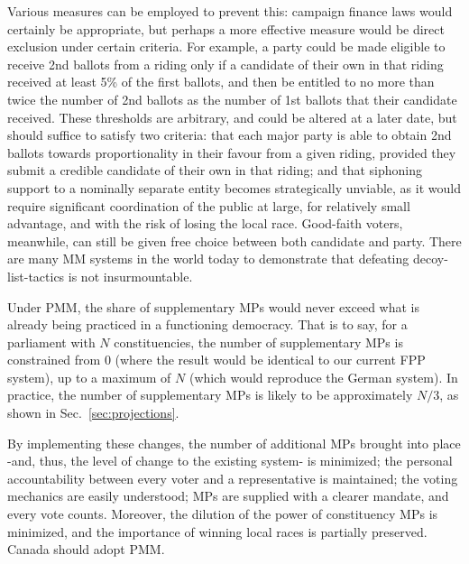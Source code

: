 \documentclass[DIV=calc, paper=a4, fontsize=11pt, twocolumn]{scrartcl}	 %
\begin{document}
Various measures can be employed to prevent this: campaign finance laws would certainly be appropriate, but perhaps a more  effective measure would be direct exclusion under certain criteria.
For example, a party could be made eligible to receive 2nd ballots from a riding only if a candidate of their own in that riding received at least 5\% of the first ballots, and then be entitled to no more than twice the number of 2nd ballots as the number of 1st ballots that their candidate received. 
These thresholds are arbitrary, and could be altered at a later date, but should suffice to satisfy two criteria: that each major party is able to obtain 2nd ballots towards proportionality in their favour from a given riding, provided they submit a credible candidate of their own in that riding; and that siphoning support to a nominally separate entity becomes strategically unviable, as it would require significant coordination of the public at large, for relatively small advantage, and with the risk of losing the local race.
Good-faith voters, meanwhile, can still be given free choice between both candidate and party.
There are many MM systems in the world today to demonstrate that defeating decoy-list-tactics is not insurmountable.

Under PMM, the share of supplementary MPs would never exceed what is already being practiced in a functioning democracy. That is to say, for a parliament with $N$ constituencies, the number of supplementary MPs is constrained from 0 (where the result would be identical to our current FPP system), up to a maximum of $N$ (which would reproduce the German system). In practice, the number of supplementary MPs is likely to be approximately $N/3$, as shown in Sec.~\ref{sec:projections}.

By implementing these changes, the number of additional MPs brought into place \--and, thus, the level of change to the existing system\-- is minimized; the  personal accountability between every voter and a representative is maintained; the voting mechanics are easily understood; MPs are supplied with a clearer mandate, and every vote counts. 
Moreover, the dilution of the power of constituency MPs is minimized, and the importance of winning local races is partially preserved.
Canada should adopt PMM. 

\end{document}
